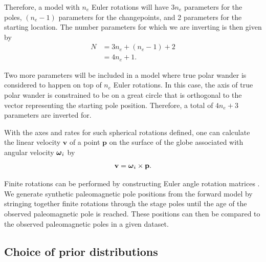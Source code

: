 \documentclass[11pt,letterpaper]{article}
\newcommand{\mitbf}[1]{\hbox{\mathversion{bold}$#1$}}
\begin{document}
Therefore, a model with $n_e$ Euler rotations will have $3 n_e$ parameters for the poles, $(n_e-1)$ parameters for the changepoints, and 2 parameters for the starting location. The number parameters for which we are inverting is then given by
\begin{equation}
\begin{aligned}
N &= 3 n_e + (n_e -1) + 2 \\
 &= 4 n_e + 1.
\end{aligned}
\label{eq:n_parameters}
\end{equation}

Two more parameters will be included in a model where true polar wander is considered to happen on top of $n_e$ Euler rotations. In this case, the axis of true polar wander is constrained to be on a great circle that is orthogonal to the vector representing the starting pole position. Therefore, a total of $4 n_e + 3$ parameters are inverted for. 

With the axes and rates for such spherical rotations defined, one can calculate the linear velocity $\mathbf{v}$ of a point $\mathbf{p}$ on the surface of the globe associated with angular velocity $\mitbf{\omega}_i$ by
\begin{equation}
\mathbf{v} = \mitbf{\omega}_i \times \mathbf{p}.
\label{eq:rigid_rotation}
\end{equation}


Finite rotations can be performed by constructing Euler angle rotation matrices \citep[cf.][]{Goldstein1965a}.  We generate synthetic paleomagnetic pole positions from the forward model by stringing together finite rotations through the stage poles until the age of the observed paleomagnetic pole is reached. These positions can then be compared to the observed paleomagnetic poles in a given dataset.

\subsection*{Choice of prior distributions}
\label{sec:priors}
\end{document}
